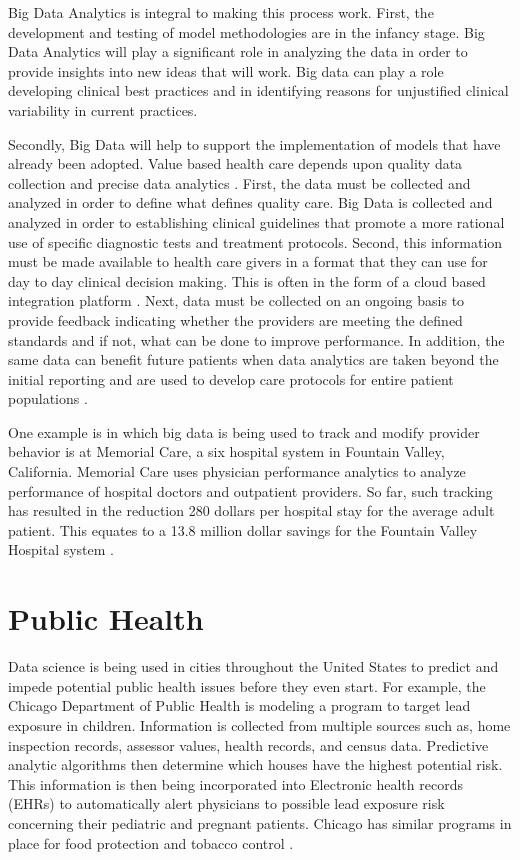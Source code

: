 \documentclass[sigconf]{acmart}
\begin{document}
Big Data Analytics is integral to making this process work. First, the development and testing of model methodologies are in the infancy stage. Big Data Analytics will play a significant role in analyzing the data in order to provide insights into new ideas that will work. Big data can play a role developing clinical best practices and in identifying reasons for unjustified clinical variability in current practices.

Secondly, Big Data will help to support the implementation of models that have already been adopted. Value based health care depends upon quality data collection and precise data analytics \cite{www-google-liason}.  First, the data must be collected and analyzed in order to define what defines quality care. Big Data is collected and analyzed in order to establishing clinical guidelines that promote a more rational use of specific diagnostic tests and treatment protocols.  Second, this information must be made available to health care givers in a format that they can use for day to day clinical decision making. This is often in the form of a cloud based integration platform \cite{www-google-liason}.  Next, data must be collected on an ongoing basis to provide feedback indicating whether the providers are meeting the defined standards and if not, what can be done to improve performance. In addition, the same data can benefit future patients when data analytics are taken beyond the initial reporting and are used to develop care protocols for entire patient populations \cite{www-google-liason}. 

One example is in which big data is being used to track and modify provider behavior is at Memorial Care, a six hospital system in Fountain Valley, California. Memorial Care uses physician performance analytics to analyze performance of hospital doctors and outpatient providers.  So far, such tracking has resulted in the reduction 280 dollars per hospital stay for the average adult patient. This equates to a 13.8 million dollar savings for the Fountain Valley Hospital system \cite{www-google-Datafloq}.
 

\section{Public Health}
Data science is being used in cities throughout the United States to predict and impede potential public health issues before they even start.  For example, the Chicago Department of Public Health is modeling a program to target lead exposure in children.  Information is collected from multiple sources such as, home inspection records, assessor values, health records, and census data.  Predictive analytic algorithms then determine which houses have the highest potential risk.  This information is then being incorporated into Electronic health records (EHRs) to automatically alert physicians to possible lead exposure risk concerning their pediatric and pregnant patients.  Chicago has similar programs in place for food protection and tobacco control \cite{www-google-chicago}.
\end{document}
